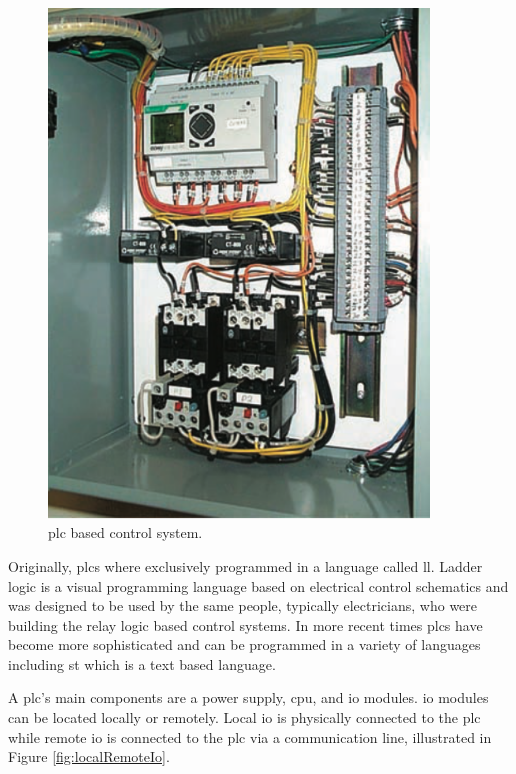 \begin{figure}[H]
\begin{minipage}{0.35\textwidth}
        \includegraphics[width = 0.9\textwidth]{2_images/plcLogic.png}
        \caption{\acrshort{plc} based control system.~\cite{petruzella2017programmable}}
        \label{fig:plcLogic}
    \end{minipage}\hfill            
    \end{figure}   
    
    Originally, \acrshort{plc}s where exclusively programmed in a language called \acrfull{ll}\cite{petruzella2017programmable}. Ladder logic is a visual programming language based on electrical control schematics and was designed to be used by the same people, typically electricians, who were building the relay logic based control systems\cite{petruzella2017programmable}. In more recent times \acrshort{plc}s have become more sophisticated and can be programmed in a variety of languages including \acrfull{st} which is a text based language\cite{petruzella2017programmable}. 
    
    A \acrshort{plc}'s main components are a power supply, \acrlong{cpu}, and \acrshort{io} modules. \acrshort{io} modules can be located locally or remotely. Local \acrshort{io} is physically connected to the \acrshort{plc} while remote \acrshort{io} is connected to the \acrshort{plc} via a communication line, illustrated in Figure \ref{fig:localRemoteIo}.
       
